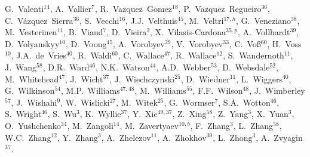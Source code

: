 \documentclass[12pt,a4paper]{article}
\begin{document}
\begin{flushleft}
G.~Valenti$^{14}$, 
A.~Vallier$^{7}$, 
R.~Vazquez~Gomez$^{18}$, 
P.~Vazquez~Regueiro$^{36}$, 
C.~V\'{a}zquez~Sierra$^{36}$, 
S.~Vecchi$^{16}$, 
J.J.~Velthuis$^{45}$, 
M.~Veltri$^{17,h}$, 
G.~Veneziano$^{38}$, 
M.~Vesterinen$^{11}$, 
B.~Viaud$^{7}$, 
D.~Vieira$^{2}$, 
X.~Vilasis-Cardona$^{35,p}$, 
A.~Vollhardt$^{39}$, 
D.~Volyanskyy$^{10}$, 
D.~Voong$^{45}$, 
A.~Vorobyev$^{29}$, 
V.~Vorobyev$^{33}$, 
C.~Vo\ss$^{60}$, 
H.~Voss$^{10}$, 
J.A.~de~Vries$^{40}$, 
R.~Waldi$^{60}$, 
C.~Wallace$^{47}$, 
R.~Wallace$^{12}$, 
S.~Wandernoth$^{11}$, 
J.~Wang$^{58}$, 
D.R.~Ward$^{46}$, 
N.K.~Watson$^{44}$, 
A.D.~Webber$^{53}$, 
D.~Websdale$^{52}$, 
M.~Whitehead$^{47}$, 
J.~Wicht$^{37}$, 
J.~Wiechczynski$^{25}$, 
D.~Wiedner$^{11}$, 
L.~Wiggers$^{40}$, 
G.~Wilkinson$^{54}$, 
M.P.~Williams$^{47,48}$, 
M.~Williams$^{55}$, 
F.F.~Wilson$^{48}$, 
J.~Wimberley$^{57}$, 
J.~Wishahi$^{9}$, 
W.~Wislicki$^{27}$, 
M.~Witek$^{25}$, 
G.~Wormser$^{7}$, 
S.A.~Wotton$^{46}$, 
S.~Wright$^{46}$, 
S.~Wu$^{3}$, 
K.~Wyllie$^{37}$, 
Y.~Xie$^{49,37}$, 
Z.~Xing$^{58}$, 
Z.~Yang$^{3}$, 
X.~Yuan$^{3}$, 
O.~Yushchenko$^{34}$, 
M.~Zangoli$^{14}$, 
M.~Zavertyaev$^{10,b}$, 
F.~Zhang$^{3}$, 
L.~Zhang$^{58}$, 
W.C.~Zhang$^{12}$, 
Y.~Zhang$^{3}$, 
A.~Zhelezov$^{11}$, 
A.~Zhokhov$^{30}$, 
L.~Zhong$^{3}$, 
A.~Zvyagin$^{37}$.\bigskip


\end{flushleft}
\end{document}
